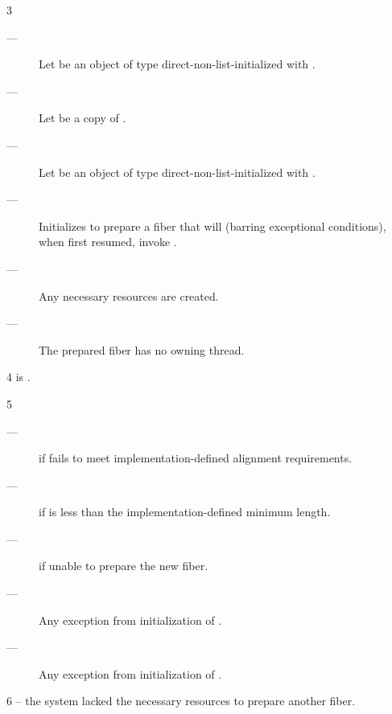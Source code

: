 3 \effects
\begin{description}
    \item[---] Let  be an object of
               type  direct-non-list-initialized
               with . 
    \item[---] Let  be a copy of .
    \item[---] Let  be an object of
               type  direct-non-list-initialized
               with . 
    \item[---] Initializes  to prepare a fiber that will (barring
               exceptional conditions), when first resumed, invoke .
    \item[---] Any necessary resources are created.
    \item[---] The prepared fiber has no owning thread.
\end{description}

4 \postcond
\emptyfn is \false.

5 \except
\begin{description}
    \item[---]  if  fails to meet
               implementation-defined alignment requirements.
    \item[---]  if  is less than the
               implementation-defined minimum length.
    \item[---]  if unable to prepare the new fiber.
    \item[---] Any exception from initialization of .
    \item[---] Any exception from initialization of .
\end{description}

6 \errors
{} -- the system lacked the necessary resources to prepare another fiber.

